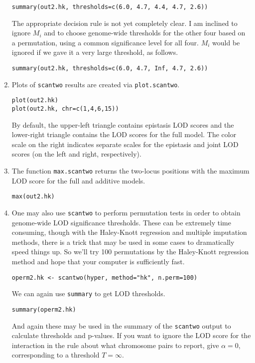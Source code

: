 \documentclass[10pt,letterpaper]{article}
\newcommand{\usercolor}{\color [named]{BlueViolet}}
\begin{document}
\begin{enumerate}
\usercolor
\verb|summary(out2.hk, thresholds=c(6.0, 4.7, 4.4, 4.7, 2.6))|
\normalcolor

The appropriate decision rule is not yet completely clear.  I am
inclined to ignore $M_i$ and to choose genome-wide thresholds for the
other four based on a permutation, using a common significance level
for all four.  $M_i$ would be ignored if we gave it a very large
threshold, as follows.

\usercolor
\verb|summary(out2.hk, thresholds=c(6.0, 4.7, Inf, 4.7, 2.6))|
\normalcolor

\item Plots of \verb-scantwo- results are created via
  \verb-plot.scantwo-.  

\usercolor
\verb|plot(out2.hk)| \\
\verb|plot(out2.hk, chr=c(1,4,6,15))|
\normalcolor

By default, the upper-left triangle contains epistasis LOD scores and
the lower-right triangle contains the LOD scores for the full model.
The color scale on the right indicates separate scales for the
epistasis and joint LOD scores (on the left and right, respectively).

\item The function \verb-max.scantwo- returns the two-locus positions
with the maximum LOD score for the full and additive models.

\usercolor
\verb|max(out2.hk)|
\normalcolor

\item One may also use \verb-scantwo- to perform permutation tests in
order to obtain genome-wide LOD significance thresholds.  These can be
extremely time consuming, though with the Haley-Knott regression and
multiple imputation methods, there is a trick that may be used in some
cases to dramatically speed things up.  So we'll try 100 permutations
by the Haley-Knott regression method and hope that your computer is
sufficiently fast.

\usercolor
\verb|operm2.hk <- scantwo(hyper, method="hk", n.perm=100)|
\normalcolor

We can again use \verb-summary- to get LOD thresholds.

\usercolor
\verb|summary(operm2.hk)|
\normalcolor

And again these may be used in the summary of the \verb-scantwo-
output to calculate thresholds and p-values.  If you want to ignore
the LOD score for the interaction in the rule about what chromosome
pairs to report, give $\alpha=0$, corresponding to a threshold
$T=\infty$. 


\end{enumerate}
\end{document}
